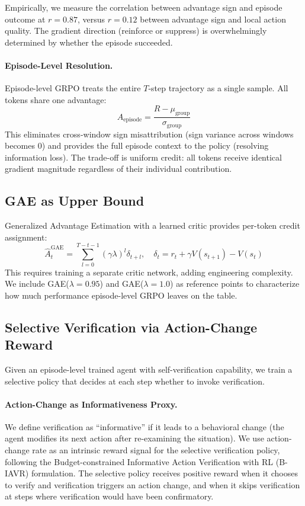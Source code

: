 \documentclass[11pt]{article}
\begin{document}
Empirically, we measure the correlation between advantage sign and episode outcome at $r=0.87$, versus $r=0.12$ between advantage sign and local action quality. The gradient direction (reinforce or suppress) is overwhelmingly determined by whether the episode succeeded.

\paragraph{Episode-Level Resolution.}
Episode-level GRPO treats the entire $T$-step trajectory as a single sample. All tokens share one advantage:
\begin{equation}
A_{\text{episode}} = \frac{R - \mu_{\text{group}}}{\sigma_{\text{group}}}
\end{equation}
This eliminates cross-window sign misattribution (sign variance across windows becomes 0) and provides the full episode context to the policy (resolving information loss). The trade-off is uniform credit: all tokens receive identical gradient magnitude regardless of their individual contribution.

\subsection{GAE as Upper Bound}

Generalized Advantage Estimation with a learned critic provides per-token credit assignment:
\begin{equation}
\hat{A}_t^{\text{GAE}} = \sum_{l=0}^{T-t-1} (\gamma\lambda)^l \delta_{t+l}, \quad \delta_t = r_t + \gamma V(s_{t+1}) - V(s_t)
\end{equation}
This requires training a separate critic network, adding engineering complexity. We include GAE($\lambda=0.95$) and GAE($\lambda=1.0$) as reference points to characterize how much performance episode-level GRPO leaves on the table.

\subsection{Selective Verification via Action-Change Reward}

Given an episode-level trained agent with self-verification capability, we train a selective policy that decides at each step whether to invoke verification.

\paragraph{Action-Change as Informativeness Proxy.}
We define verification as ``informative'' if it leads to a behavioral change (the agent modifies its next action after re-examining the situation). We use action-change rate as an intrinsic reward signal for the selective verification policy, following the Budget-constrained Informative Action Verification with RL (B-IAVR) formulation. The selective policy receives positive reward when it chooses to verify and verification triggers an action change, and when it skips verification at steps where verification would have been confirmatory.
\end{document}
